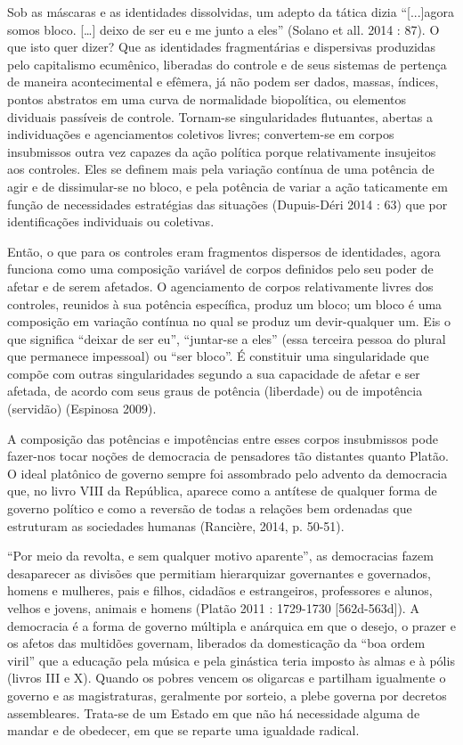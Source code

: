 Sob as máscaras e as identidades dissolvidas, um adepto da tática dizia
``{[}...{]}agora somos bloco. {[}\ldots{}{]} deixo de ser eu e me junto
a eles'' (Solano et all. 2014 : 87). O que isto quer dizer? Que as
identidades fragmentárias e dispersivas produzidas pelo capitalismo
ecumênico, liberadas do controle e de seus sistemas de pertença de
maneira acontecimental e efêmera, já não podem ser dados, massas,
índices, pontos abstratos em uma curva de normalidade biopolítica, ou
elementos dividuais passíveis de controle. Tornam-se singularidades
flutuantes, abertas a individuações e agenciamentos coletivos livres;
convertem-se em corpos insubmissos outra vez capazes da ação política
porque relativamente insujeitos aos controles. Eles se definem mais pela
variação contínua de uma potência de agir e de dissimular-se no bloco, e
pela potência de variar a ação taticamente em função de necessidades
estratégias das situações (Dupuis-Déri 2014 : 63) que por identificações
individuais ou coletivas.

Então, o que para os controles eram fragmentos dispersos de identidades,
agora funciona como uma composição variável de corpos definidos pelo seu
poder de afetar e de serem afetados. O agenciamento de corpos
relativamente livres dos controles, reunidos à sua potência específica,
produz um bloco; um bloco é uma composição em variação contínua no qual
se produz um devir-qualquer um. Eis o que significa ``deixar de ser
eu'', ``juntar-se a eles'' (essa terceira pessoa do plural que permanece
impessoal) ou ``ser bloco''. É constituir uma singularidade que compõe
com outras singularidades segundo a sua capacidade de afetar e ser
afetada, de acordo com seus graus de potência (liberdade) ou de
impotência (servidão) (Espinosa 2009).

A composição das potências e impotências entre esses corpos insubmissos
pode fazer-nos tocar noções de democracia de pensadores tão distantes
quanto Platão. O ideal platônico de governo sempre foi assombrado pelo
advento da democracia que, no livro VIII da República, aparece como a
antítese de qualquer forma de governo político e como a reversão de
todas a relações bem ordenadas que estruturam as sociedades humanas
(Rancière, 2014, p. 50-51).

``Por meio da revolta, e sem qualquer motivo aparente'', as democracias
fazem desaparecer as divisões que permitiam hierarquizar governantes e
governados, homens e mulheres, pais e filhos, cidadãos e estrangeiros,
professores e alunos, velhos e jovens, animais e homens (Platão 2011 :
1729-1730 {[}562d-563d{]}). A democracia é a forma de governo múltipla e
anárquica em que o desejo, o prazer e os afetos das multidões governam,
liberados da domesticação da ``boa ordem viril'' que a educação pela
música e pela ginástica teria imposto às almas e à pólis (livros III e
X). Quando os pobres vencem os oligarcas e partilham igualmente o
governo e as magistraturas, geralmente por sorteio, a plebe governa por
decretos assembleares. Trata-se de um Estado em que não há necessidade
alguma de mandar e de obedecer, em que se reparte uma igualdade radical.

